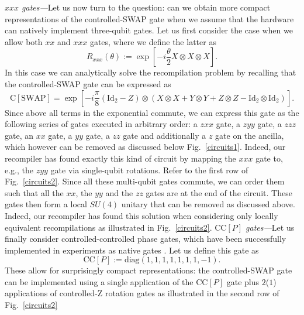 \documentclass[aps,prx,showpacs,twocolumn,reprint]{revtex4-2}
\begin{document}
{\emph{$xxx$ gates---}Let us now turn to the question: can we obtain more compact representations
of the controlled-SWAP gate when we assume that the hardware can natively implement three-qubit gates.
Let us first consider the case when we allow both $xx$ and $xxx$ gates, where we define the latter as
\begin{equation*}
	R_{xxx}(\theta) := \exp[-i \frac{\theta}{2} X \otimes X \otimes X  ].
\end{equation*}
In this case we can analytically solve the recompilation problem by recalling that
the controlled-SWAP gate can be expressed as
\begin{equation*}
	\mathrm{C}[\text{SWAP}] = \exp[-i \frac{\pi}{8} (\mathrm{Id}_2 -Z) \otimes ( X \otimes X + Y \otimes Y + Z \otimes Z - \mathrm{Id}_2 \otimes \mathrm{Id}_2  )  ].
\end{equation*}
Since above all terms in the exponential commute, we can express this gate as the following series
of gates executed in arbitrary order: a $zxx$ gate, a $zyy$ gate, a $zzz$ gate, an $xx$ gate, a $yy$ gate,
a $zz$ gate and additionally a $z$ gate on the ancilla, which however can be removed as discussed below Fig.~\ref{circuits1}.
Indeed, our recompiler has found exactly this kind of circuit by mapping the $xxx$ gate to, e.g., the $zyy$ gate via single-qubit
rotations. Refer to the first row of Fig.~\ref{circuits2}. Since all these multi-qubit gates commute, we can order them such that
all the $xx$, the $yy$ and the $zz$ gates are at the end of the circuit. These gates then form a local $SU(4)$ unitary that
can be removed as discussed above. Indeed, our recompiler has found this solution when considering only locally
equivalent recompilations as illustrated in Fig.~\ref{circuits2}.
\emph{$\mathrm{CC}[P]$ gates---}Let us finally consider controlled-controlled phase gates, which have been
successfully implemented in experiments as native gates \cite{fedorov2012implementation}. Let us define this gate as
\begin{equation*}
	\mathrm{CC}[P] := \mathrm{diag}(1,1,1,1,1,1,1,-1).
\end{equation*}
These allow for surprisingly compact representations: the controlled-SWAP gate can be implemented using a single application
of the $\mathrm{CC}[P]$ gate plus $2$($1$) applications of controlled-Z rotation gates as illustrated in the second row
of Fig.~\ref{circuits2}







}
\end{document}
